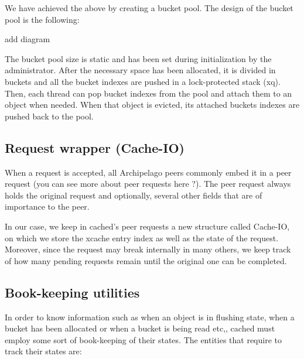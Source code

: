 We have achieved the above by creating a bucket pool. The design of the bucket 
pool is the following:

\fixme add diagram

The bucket pool size is static and has been set during initialization by the 
administrator. After the necessary space has been allocated, it is divided in 
buckets and all the bucket indexes are pushed in a lock-protected stack (xq).  
Then, each thread can pop bucket indexes from the pool and attach them
to an object when needed. When that object is evicted, its attached buckets 
indexes are pushed back to the pool.

\subsection{Request wrapper (Cache-IO)}

When a request is accepted, all Archipelago peers commonly embed it in a peer 
request (you can see more about peer requests here ?). The peer request always 
holds the original request and optionally, several other fields that are of 
importance to the peer.

In our case, we keep in cached's peer requests a new structure called Cache-IO, 
on which we store the xcache entry index as well as the state of the request.  
Moreover, since the request may break internally in many others, we keep track 
of how many pending requests remain until the original one can be completed.

\subsection{Book-keeping utilities}\label{sec:cached-states-design}

In order to know information such as when an object is in flushing state, when 
a bucket has been allocated or when a bucket is being read etc,, cached must 
employ some sort of book-keeping of their states. The entities that require to 
track their states are:

